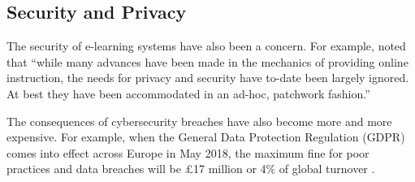 

\subsection{Security and Privacy}

The security of e-learning systems have also been a concern. For example, \citet{el2003privacy} noted that “while many 
advances have been made in the mechanics of providing online instruction, the needs for privacy and security have to-date 
been largely ignored. At best they have been accommodated in an ad-hoc, patchwork fashion.”

The consequences of cybersecurity breaches have also become more and more expensive. For example, when the General Data 
Protection Regulation (GDPR) comes into effect across Europe in May 2018, the maximum fine for poor practices and data 
breaches will be £17 million or 4\% of global turnover \citep{ico2017gdpr}.

